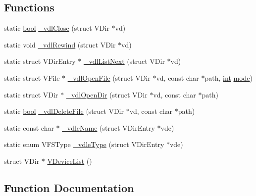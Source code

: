 \subsection*{Functions}
\begin{DoxyCompactItemize}
\item 
static \mbox{\hyperlink{libretro_8h_a4a26dcae73fb7e1528214a068aca317e}{bool}} \mbox{\hyperlink{vfs-devlist_8c_acdb47b8fbd74f17be9a1d73d41e5dbcd}{\+\_\+vdl\+Close}} (struct V\+Dir $\ast$vd)
\item 
static void \mbox{\hyperlink{vfs-devlist_8c_a0b42c631e426ff8d4ca9610a378e1668}{\+\_\+vdl\+Rewind}} (struct V\+Dir $\ast$vd)
\item 
static struct V\+Dir\+Entry $\ast$ \mbox{\hyperlink{vfs-devlist_8c_a2d13d4980fd85b4714d37e3d53a6aff8}{\+\_\+vdl\+List\+Next}} (struct V\+Dir $\ast$vd)
\item 
static struct V\+File $\ast$ \mbox{\hyperlink{vfs-devlist_8c_acb6e731f02f207723fe2d49f597c8e30}{\+\_\+vdl\+Open\+File}} (struct V\+Dir $\ast$vd, const char $\ast$path, \mbox{\hyperlink{ioapi_8h_a787fa3cf048117ba7123753c1e74fcd6}{int}} \mbox{\hyperlink{ioapi_8h_a7e43d41c2fe013a373b540cba02505cf}{mode}})
\item 
static struct V\+Dir $\ast$ \mbox{\hyperlink{vfs-devlist_8c_aaf038c5fba8a9f2f2f8c10b67ee85a2d}{\+\_\+vdl\+Open\+Dir}} (struct V\+Dir $\ast$vd, const char $\ast$path)
\item 
static \mbox{\hyperlink{libretro_8h_a4a26dcae73fb7e1528214a068aca317e}{bool}} \mbox{\hyperlink{vfs-devlist_8c_a0b475104106edfb663b7e7e34b997acd}{\+\_\+vdl\+Delete\+File}} (struct V\+Dir $\ast$vd, const char $\ast$path)
\item 
static const char $\ast$ \mbox{\hyperlink{vfs-devlist_8c_addf63a1aab1d6a14f8c00f3a4d9e5d6f}{\+\_\+vdle\+Name}} (struct V\+Dir\+Entry $\ast$vde)
\item 
static enum V\+F\+S\+Type \mbox{\hyperlink{vfs-devlist_8c_a243a40bbeeef820785783e97ab9db277}{\+\_\+vdle\+Type}} (struct V\+Dir\+Entry $\ast$vde)
\item 
struct V\+Dir $\ast$ \mbox{\hyperlink{vfs-devlist_8c_a36b1aed5737fa71dced20925de25a143}{V\+Device\+List}} ()
\end{DoxyCompactItemize}


\subsection{Function Documentation}
\mbox{\label{vfs-devlist_8c_acdb47b8fbd74f17be9a1d73d41e5dbcd}} 
